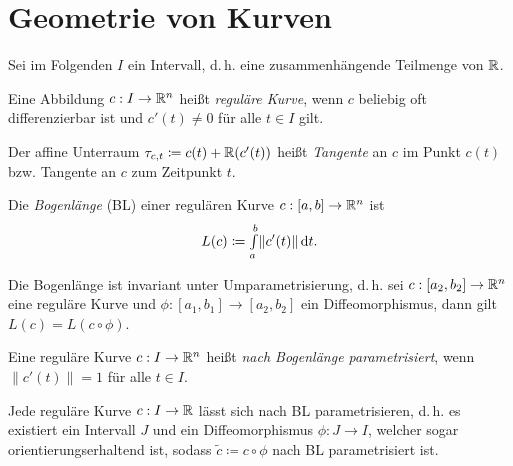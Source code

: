 \documentclass{cheat-sheet}
\newcommand{\Intabdt}[1]{\Int{a}{b}{#1}{t}}
\begin{document}


\section{Geometrie von Kurven}


\begin{nota}
  Sei im Folgenden $I$ ein Intervall, d.\,h. eine zusammenhängende Teilmenge von $\mathbb{R}$.
\end{nota}

\begin{defn}
  Eine Abbildung $c : I \to \mathbb{R}^n$ heißt \emph{reguläre Kurve}, wenn $c$ beliebig oft differenzierbar ist und $c'(t) \not= 0$ für alle $t \in I$ gilt.

  Der affine Unterraum $\tau_{c,t} \coloneqq c(t) + \mathbb{R}(c'(t))$ heißt \emph{Tangente} an $c$ im Punkt $c(t)$ bzw. Tangente an $c$ zum Zeitpunkt $t$.
\end{defn}


\begin{defn}
  Die \emph{Bogenlänge} (BL) einer regulären Kurve $c : [a, b] \to \mathbb{R}^n$ ist
  \[ L(c) \coloneqq \Intabdt{\|c'(t)\|}. \]
\end{defn}

\begin{satz}
  Die Bogenlänge ist invariant unter Umparametrisierung, d.\,h. sei $c : [a_2, b_2] \to \mathbb{R}^n$ eine reguläre Kurve und $\phi : [a_1, b_1] \to [a_2, b_2]$ ein Diffeomorphismus, dann gilt $L(c) = L(c \circ \phi)$.
\end{satz}

\begin{defn}
  Eine reguläre Kurve $c : I \to \mathbb{R}^n$ heißt \emph{nach Bogenlänge parametrisiert}, wenn $\| c'(t) \| = 1$ für alle $t \in I$.
\end{defn}

\begin{satz}
  Jede reguläre Kurve $c : I \to \mathbb{R}$ lässt sich nach BL parametrisieren, d.\,h. es existiert ein Intervall $J$ und ein Diffeomorphismus $\phi : J \to I$, welcher sogar orientierungserhaltend ist, sodass $\tilde{c} \coloneqq c \circ \phi$ nach BL parametrisiert ist.
\end{satz}
\end{document}
